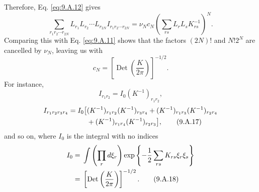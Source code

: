 Therefore, Eq. \eqref{eq:9.A.12} gives
\begin{equation}
  \sum_{r_1r_2\cdots r_{2N}}L_{r_1}L_{r_2}\cdots L_{r_{2N}}
  I_{r_1r_2\cdots r_{2N}}
  =\nu_Nc_N\left(\sum_{rs}L_rL_sK^{-1}_{rs}\right)^N.
  \tag{9.A.14}\label{eq:9.A.14}
\end{equation}
Comparing this with Eq. \eqref{eq:9.A.11} shows that the factors $(2N)!$ and
$N!2^N$ are cancelled by $\nu_N$, leaving us with
\begin{equation}
  c_N=\left[\operatorname{Det}\left(\frac{K}{2\pi}\right)\right]^{-1/2}.
  \tag{9.A.15}\label{eq:9.A.15}
\end{equation}
For instance,
\begin{equation}
  I_{r_1r_2}=I_0(K^{-1})_{r_1r_2},
  \tag{9.A.16}\label{eq:9.A.16}
\end{equation}
\begin{align}
  I_{r_1r_2r_3r_4}=I_0\bigl[{}&(K^{-1})_{r_1r_2}(K^{-1})_{r_3r_4}
  +(K^{-1})_{r_1r_3}(K^{-1})_{r_2r_4}
  \notag\\
  &+(K^{-1})_{r_1r_4}(K^{-1})_{r_2r_3}\bigr],
  \tag{9.A.17}\label{eq:9.A.17}
\end{align}
and so on, where $I_0$ is the integral with no indices
\begin{align}
  I_0
  &={}\int\left(\prod_r d\xi_r\right)
  \exp\left\{-\frac{1}{2}\sum_{rs}K_{rs}\xi_r\xi_s\right\}
  \notag\\
  &={}\left[\operatorname{Det}\left(\frac{K}{2\pi}\right)\right]^{-1/2}.
  \tag{9.A.18}\label{eq:9.A.18}
\end{align}
